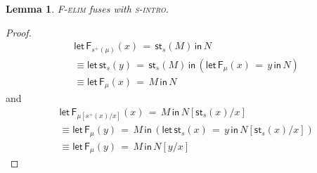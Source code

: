 \documentclass[10pt]{article}
\newtheorem{lemma}{Lemma}
\theoremstyle{definition}
\newcommand\StI[2]{\ensuremath{\mathsf{st}_{#1}(#2)}}
\newcommand\StE[4]{\ensuremath{\mathsf{let} \, \StI{#1}{#3} \, = \, {#2} \, \mathsf{in} \, #4}}
\newcommand\FEs[4]{\ensuremath{\mathsf{let} \, \mathsf{F}_{#1}(#3) \, = \, {#2} \, \mathsf{in} \, #4}}
\newcommand\TrPlus[2]{\ensuremath{{#1}^+(#2)}}
\begin{document}
\begin{lemma}
\textsc{F-elim} fuses with \textsc{s-intro}.
\end{lemma}
\begin{proof}
\begin{align*}
&\FEs{\TrPlus{s}{\mu}}{\StI{s}{M}}{x}{N} \\
&\equiv \StE{s}{\StI{s}{M}}{y}{(\FEs{\mu}{y}{x}{N})} \\
&\equiv \FEs{\mu}{M}{x}{N}
\end{align*}
and
\begin{align*}
& \FEs{\mu[\TrPlus{s}{x}/x]}{M}{x}{N[\StI{s}{x}/x]} \\
&\equiv \FEs{\mu}{M}{y}{(\StE{s}{y}{x}{N[\StI{s}{x}/x]})}  \\
&\equiv \FEs{\mu}{M}{y}{N[y/x]} 
\end{align*}
\end{proof}
\end{document}
